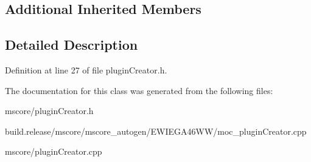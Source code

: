 \subsection*{Additional Inherited Members}


\subsection{Detailed Description}


Definition at line 27 of file plugin\+Creator.\+h.



The documentation for this class was generated from the following files\+:\begin{DoxyCompactItemize}
\item 
mscore/plugin\+Creator.\+h\item 
build.\+release/mscore/mscore\+\_\+autogen/\+E\+W\+I\+E\+G\+A46\+W\+W/moc\+\_\+plugin\+Creator.\+cpp\item 
mscore/plugin\+Creator.\+cpp\end{DoxyCompactItemize}
